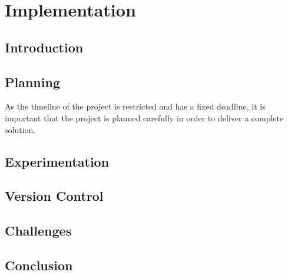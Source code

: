 \chapter{Implementation}
\section{Introduction}

\section{Planning}
As the timeline of the project is restricted and has a fixed deadline, it is important that the project is planned carefully in order to deliver a complete solution. 

\section{Experimentation}

\section{Version Control}

\section{Challenges}

\section{Conclusion}


